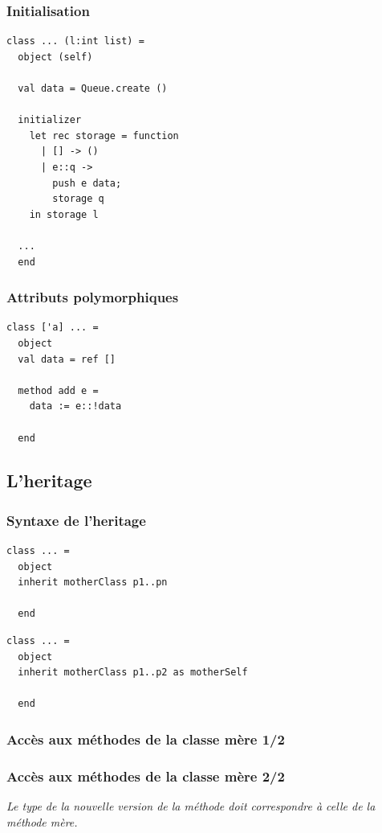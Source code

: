 \begin{frame}[fragile]
	\frametitle{Initialisation}
	\begin{lstlisting}
class ... (l:int list) =
  object (self)
    
  val data = Queue.create ()

  initializer
    let rec storage = function
      | [] -> ()
      | e::q -> 
        push e data;
        storage q
    in storage l

  ...
  end
	\end{lstlisting}
\end{frame}

\begin{frame}[fragile]
	\frametitle{Attributs polymorphiques}
	\begin{lstlisting}
class ['a] ... =
  object 
  val data = ref []

  method add e =
    data := e::!data

  end
	\end{lstlisting}
\end{frame}

\subsection{L'heritage} %
\begin{frame}[fragile]
	\frametitle{Syntaxe de l'heritage}
	\begin{lstlisting}
class ... =
  object
  inherit motherClass p1..pn

  end
	\end{lstlisting}
	\begin{lstlisting}
class ... =
  object
  inherit motherClass p1..p2 as motherSelf

  end
	\end{lstlisting}
\end{frame}

\begin{frame}
	\frametitle{Accès aux méthodes de la classe mère 1/2}
	
\end{frame}

\begin{frame}
	\frametitle{Accès aux méthodes de la classe mère 2/2}
	\textit{Le type de la nouvelle version de la méthode doit correspondre à celle de la méthode mère.}
	
\end{frame}
